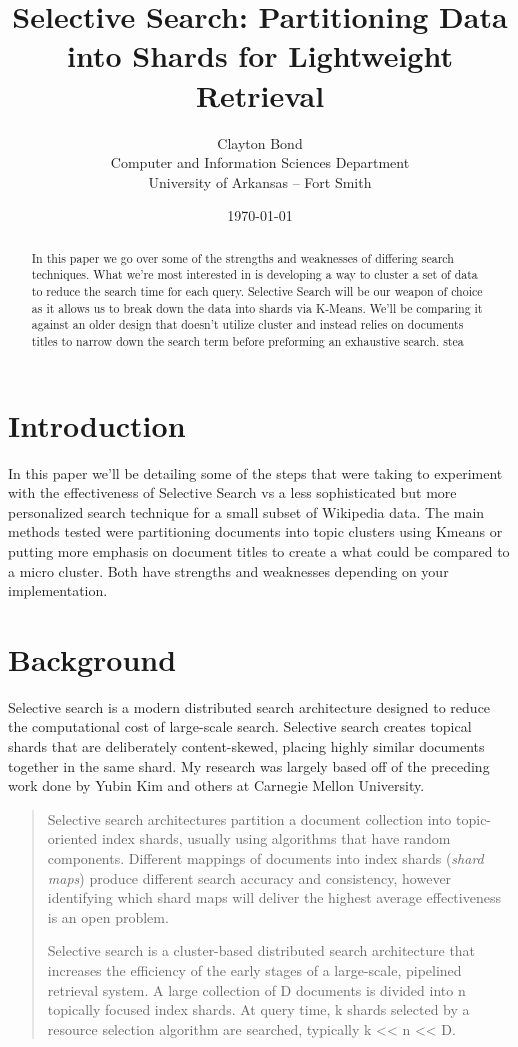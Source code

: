 \documentclass{article}
\title{Selective Search: Partitioning Data into Shards for Lightweight Retrieval}
\author{Clayton Bond \\    
	    Computer and Information Sciences Department \\
	    University of Arkansas -- Fort Smith}
\date{\today}
\begin{document}
\maketitle

\begin{abstract}
	In this paper we go over some of the strengths and weaknesses of differing search techniques. What we're most interested in is developing a way to cluster a set of data to reduce the search time for each query. Selective Search will be our weapon of choice as it allows us to break down the data into shards via K-Means. We'll be comparing it against an older design that doesn't utilize cluster and instead relies on documents titles to narrow down the search term before preforming an exhaustive search.  stea
\end{abstract}

\section{Introduction}
In this paper we'll be detailing some of the steps that were taking to experiment with the effectiveness of Selective Search vs a less sophisticated but more personalized search technique for a small subset of Wikipedia data. The main methods tested were partitioning documents into topic clusters using Kmeans or putting more emphasis on document titles to create a what could be compared to a micro cluster. Both have strengths and weaknesses depending on your implementation. 

\section{Background}
Selective search is a modern distributed search architecture designed to reduce the computational cost of large-scale search. Selective search creates topical shards that are deliberately content-skewed, placing highly similar documents together in the same shard. My research was largely based off of the preceding work done by Yubin Kim and others at Carnegie Mellon University.  

\begin{quote}
Selective search architectures partition a document collection into
topic-oriented index shards, usually using algorithms that have
random components. Different mappings of documents into index
shards (\textit{shard maps}) produce different search accuracy and consistency, however identifying which shard maps will deliver the
highest average effectiveness is an open problem.

Selective search is a cluster-based distributed search architecture
that increases the efficiency of the early stages of a large-scale,
pipelined retrieval system. A large collection of D documents
is divided into n topically focused index shards. At query time, k
shards selected by a resource selection algorithm are searched,
typically k << n << D.
\end{quote}
\end{document}
